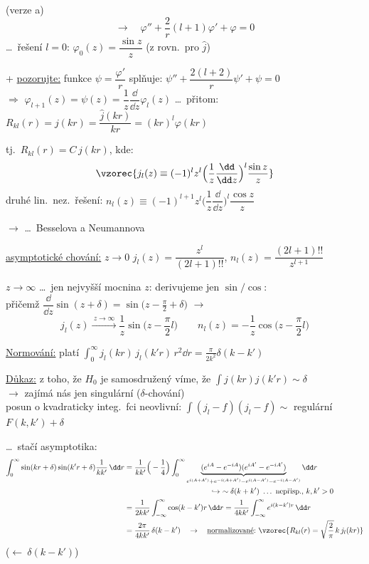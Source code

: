 {\small\hfill (verze a)}
\[
  \to\quad \varphi'' + \frac2r(l+1)\varphi' + \varphi = 0
\]
\hspace*{5cm} \dots\ řešení $l = 0$: \quad $\varphi_0(z) = \dfrac{\sin z}{z}$ \quad (z rovn.\ pro $\hat j$)

+ \underline{pozorujte:} funkce $\psi = \dfrac{\varphi'}{r}$ splňuje: \quad $\psi'' + \dfrac{2(l+2)}{r}\psi' + \psi = 0$ \\
$\Rightarrow$ \quad $\varphi_{l+1}(z) = \psi(z) = \dfrac1z\dfrac{\dd}{\dd z}\varphi_l(z)$
\quad \dots\ přitom: $R_{kl}(r) = j(kr) = \dfrac{\hat j(kr)}{kr} = (kr)^l\varphi(kr)$

tj.\ \quad $R_{kl}(r) = C\,j(kr)$, \quad kde:
\[
  \vzorec{j_l(z) \equiv (-1)^l z^l\Big(\frac1z\frac{\dd}{\dd z}\Big)^l\frac{\sin z}{z}}
\]
\quad druhé lin.\ nez.\ řešení: \quad
$n_l(z) \equiv (-1)^{l+1}z^l\Big(\dfrac1z\dfrac{\dd}{\dd z}\Big)^l\dfrac{\cos z}{z}$

$\to$  \dots\ Besselova a Neumannova

\underline{asymptotické chování:} \quad $z\to 0$ \quad
$j_l(z) = \dfrac{z^l}{(2l+1)!!}$, \quad $n_l(z) = \dfrac{(2l+1)!!}{z^{l+1}}$ \quad {}

$z\to\infty$ \quad \dots\ jen nejvyšší mocnina $z$: derivujeme jen $\sin/\cos$: \\
\quad přičemž \quad $\dfrac{\dd}{\dd z}\sin(z + \delta) = \sin\big(z - \tfrac{\pi}{2} + \delta\big)$ \quad $\to$
\[
  j_l(z) \xrightarrow{\ z\to\infty\ } \frac1z\sin\Big(z - \frac{\pi}{2}l\Big)
  \qquad n_l(z) = -\frac1z\cos\Big(z - \frac{\pi}{2}l\Big)
\]

\underline{Normování:} \quad platí \quad $\displaystyle\int_0^\infty j_l(kr)\,j_l(k'r)\,r^2\dd r = \frac{\pi}{2k^2}\delta(k - k')$

\underline{Důkaz:} z toho, že $H_0$ je samosdružený víme, že $\int j(kr)j(k'r)\sim\delta$ \\
\quad $\to$ zajímá nás jen singulární ($\delta$-chování) \\
posun o kvadraticky integ.\ fci neovlivní: \quad $\int(j_l - f)(j_l - f)\sim$ regulární $F(k,k') + \delta$

\dots\ stačí asymptotika:
\begin{align*}
  \int_0^\infty\sin(kr+\delta)\sin(k'r+\delta)\frac{1}{kk'}\,\dd r
  &= \frac{1}{kk'}\Big(-\frac14\Big)\int_0^\infty\underbrace{(e^{iA} - e^{-iA})(e^{iA'} - e^{-iA'})}_{e^{i(A+A')} + e^{-i(A+A')} - e^{i(A-A')} - e^{-i(A-A')}}\dd r \\
  &\hspace*{4cm}\hookrightarrow\ \sim\delta(k + k')\ \dots\ \text{nepřisp., } k,k' > 0 \\
  &= \frac{1}{2kk'}\int_{-\infty}^\infty\cos(k-k')r\,\dd r = \frac{1}{4kk'}\int_{-\infty}^\infty e^{i(k-k')r}\,\dd r \\
  &= \frac{2\pi}{4kk'}\,\delta(k - k')
  \quad\to\quad \text{\underline{normalizované}:}\ \vzorec{R_{kl}(r) = \sqrt{\frac{2}{\pi}}\,k\,j_l(kr)}
\end{align*}
\hfill ($\leftarrow\ \delta(k - k')$)

